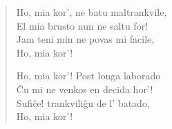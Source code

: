 \begin{verse}
                  Ho, mia kor', ne batu maltrankvile,\\
                  El mia brusto nun ne saltu for!\\
                  Jam teni min ne povas mi facile,\\
                  Ho, mia kor'!

                  Ho, mia kor'! Post longa laborado\\
                  \^Cu mi ne venkos en decida hor'!\\
                  Sufi\^ce! trankvili\^gu de l' batado,\\
                  Ho, mia kor'!

\end{verse}


\smallrule{}

